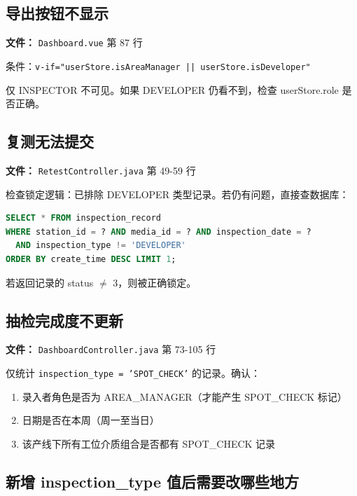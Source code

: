 \documentclass[12pt,a4paper]{ctexart}
\begin{document}
\subsection{导出按钮不显示}

\textbf{文件：} \texttt{Dashboard.vue} 第 87 行

条件：\texttt{v-if="userStore.isAreaManager || userStore.isDeveloper"}

仅 INSPECTOR 不可见。如果 DEVELOPER 仍看不到，检查 userStore.role 是否正确。

\subsection{复测无法提交}

\textbf{文件：} \texttt{RetestController.java} 第 49-59 行

检查锁定逻辑：已排除 DEVELOPER 类型记录。若仍有问题，直接查数据库：
\begin{lstlisting}[language=sql]
SELECT * FROM inspection_record
WHERE station_id = ? AND media_id = ? AND inspection_date = ?
  AND inspection_type != 'DEVELOPER'
ORDER BY create_time DESC LIMIT 1;
\end{lstlisting}
若返回记录的 status $\neq$ 3，则被正确锁定。

\subsection{抽检完成度不更新}

\textbf{文件：} \texttt{DashboardController.java} 第 73-105 行

仅统计 \texttt{inspection\_type = 'SPOT\_CHECK'} 的记录。确认：
\begin{enumerate}
    \item 录入者角色是否为 AREA\_MANAGER（才能产生 SPOT\_CHECK 标记）
    \item 日期是否在本周（周一至当日）
    \item 该产线下所有工位介质组合是否都有 SPOT\_CHECK 记录
\end{enumerate}

\subsection{新增 inspection\_type 值后需要改哪些地方}
\end{document}
